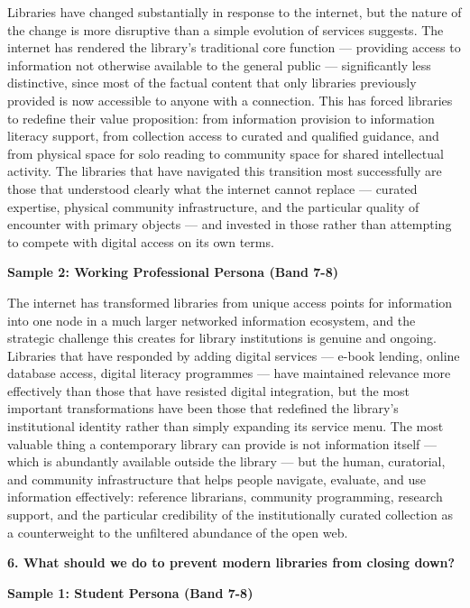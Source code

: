 Libraries have changed substantially in response to the internet, but the nature of the change is more disruptive than a simple evolution of services suggests. The internet has rendered the library's traditional core function — providing access to information not otherwise available to the general public — significantly less distinctive, since most of the factual content that only libraries previously provided is now accessible to anyone with a connection. This has forced libraries to redefine their value proposition: from information provision to information literacy support, from collection access to curated and qualified guidance, and from physical space for solo reading to community space for shared intellectual activity. The libraries that have navigated this transition most successfully are those that understood clearly what the internet cannot replace — curated expertise, physical community infrastructure, and the particular quality of encounter with primary objects — and invested in those rather than attempting to compete with digital access on its own terms.

\textbf{Sample 2: Working Professional Persona (Band 7-8)}

The internet has transformed libraries from unique access points for information into one node in a much larger networked information ecosystem, and the strategic challenge this creates for library institutions is genuine and ongoing. Libraries that have responded by adding digital services — e-book lending, online database access, digital literacy programmes — have maintained relevance more effectively than those that have resisted digital integration, but the most important transformations have been those that redefined the library's institutional identity rather than simply expanding its service menu. The most valuable thing a contemporary library can provide is not information itself — which is abundantly available outside the library — but the human, curatorial, and community infrastructure that helps people navigate, evaluate, and use information effectively: reference librarians, community programming, research support, and the particular credibility of the institutionally curated collection as a counterweight to the unfiltered abundance of the open web.

\separator

\begin{ieltsquestion}
\textbf{6. What should we do to prevent modern libraries from closing down?}
\end{ieltsquestion}
\textbf{Sample 1: Student Persona (Band 7-8)}

